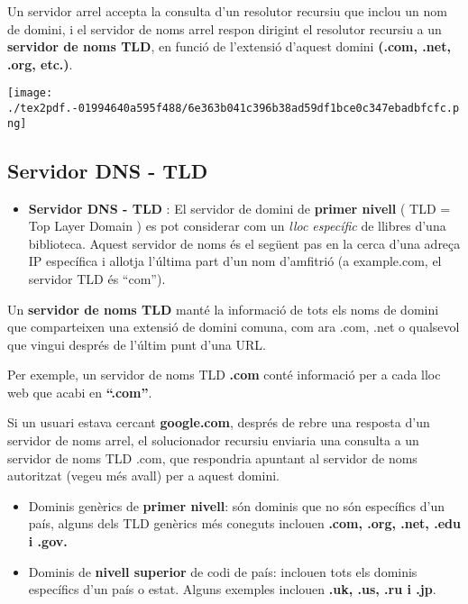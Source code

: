 \documentclass[]{article}
\providecommand{\tightlist}{%
  \setlength{\itemsep}{0pt}\setlength{\parskip}{0pt}}
\begin{document}
Un servidor arrel accepta la consulta d'un resolutor recursiu que inclou
un nom de domini, i el servidor de noms arrel respon dirigint el
resolutor recursiu a un \textbf{servidor de noms TLD}, en funció de
l'extensió d'aquest domini \textbf{(.com, .net, .org, etc.)}.

\texttt{[image: ./tex2pdf.-01994640a595f488/6e363b041c396b38ad59df1bce0c347ebadbfcfc.png]}

\hypertarget{servidor-dns---tld}{%
\subsection{\texorpdfstring{\textbf{Servidor DNS -
TLD}}{Servidor DNS - TLD}}\label{servidor-dns---tld}}

\begin{itemize}
\tightlist
\item
  \textbf{Servidor DNS - TLD} : El servidor de domini de \textbf{primer
  nivell} ( TLD = Top Layer Domain ) es pot considerar com un \emph{lloc
  específic} de llibres d'una biblioteca. Aquest servidor de noms és el
  següent pas en la cerca d'una adreça IP específica i allotja l'última
  part d'un nom d'amfitrió (a example.com, el servidor TLD és ``com'').
\end{itemize}

Un \textbf{servidor de noms TLD} manté la informació de tots els noms de
domini que comparteixen una extensió de domini comuna, com ara .com,
.net o qualsevol que vingui després de l'últim punt d'una URL.

Per exemple, un servidor de noms TLD \textbf{.com} conté informació per
a cada lloc web que acabi en \textbf{``.com''}.

Si un usuari estava cercant \textbf{google.com}, després de rebre una
resposta d'un servidor de noms arrel, el solucionador recursiu enviaria
una consulta a un servidor de noms TLD .com, que respondria apuntant al
servidor de noms autoritzat (vegeu més avall) per a aquest domini.

\begin{itemize}
\item
  Dominis genèrics de \textbf{primer nivell}: són dominis que no són
  específics d'un país, alguns dels TLD genèrics més coneguts inclouen
  \textbf{.com, .org, .net, .edu i .gov.}
\item
  Dominis de \textbf{nivell superior} de codi de país: inclouen tots els
  dominis específics d'un país o estat. Alguns exemples inclouen
  \textbf{.uk, .us, .ru i .jp}.
\end{itemize}
\end{document}
